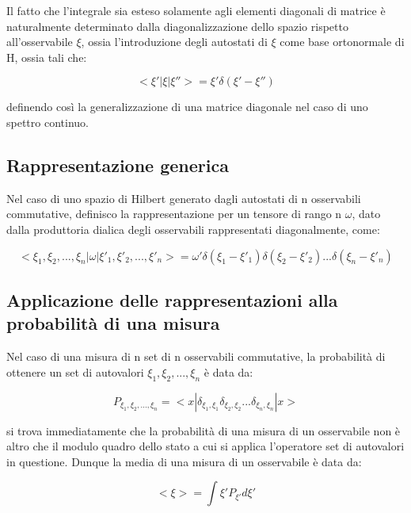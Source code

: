 \documentclass{article}
\begin{document}
Il fatto che l'integrale sia esteso solamente agli elementi diagonali di matrice è naturalmente determinato dalla diagonalizzazione
dello spazio rispetto all'osservabile $\xi$, ossia l'introduzione degli autostati di $\xi$ come base ortonormale di H, ossia tali che:

\begin{equation}
    <\xi' | \xi | \xi''>= \xi' \delta(\xi'-\xi'')
\end{equation}

definendo così la generalizzazione di una matrice diagonale nel caso di uno spettro continuo.

\subsection{Rappresentazione generica}

Nel caso di uno spazio di Hilbert generato dagli autostati di n osservabili commutative, definisco la rappresentazione per
un tensore di rango n $\omega$, dato dalla produttoria dialica degli osservabili rappresentati diagonalmente, come:

\begin{equation}
    <\xi_1,\xi_2,...,\xi_n|\omega|\xi'_1,\xi'_2,...,\xi'_n> = \omega' \delta(\xi_1-\xi'_1)\delta(\xi_2-\xi'_2)...\delta(\xi_n-\xi'_n)
\end{equation}


\subsection{Applicazione delle rappresentazioni alla probabilità di una misura}
Nel caso di una misura di n set di n osservabili commutative, la probabilità di ottenere un set di autovalori $\xi_1,\xi_2,...,\xi_n$ è data da:

\begin{equation}
    P_{\xi_1,\xi_2,...,\xi_n} = <x|\delta_{\xi_1,\xi_1}\delta_{\xi_2,\xi_2}...\delta_{\xi_n,\xi_n}|x>
\end{equation}

si trova immediatamente che la probabilità di una misura di un osservabile non è altro che il modulo quadro dello stato a cui si applica l'operatore set di autovalori in questione.
Dunque la media di una misura di un osservabile è data da:

\begin{equation}
    <\xi> = \int \xi' P_{\xi'}d\xi'
\end{equation}
\end{document}
